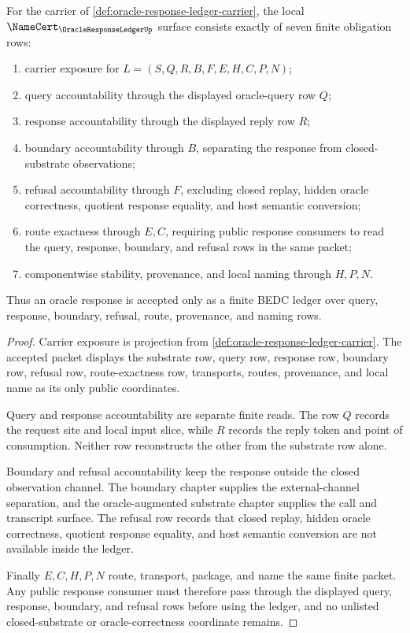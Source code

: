 \begin{theorem}
\label{thm:oracle-response-ledger-namecert-obligations}
For the carrier of \autoref{def:oracle-response-ledger-carrier}, the local
$\NameCert_{\OracleResponseLedgerUp}$ surface consists exactly of seven finite
obligation rows:
\begin{enumerate}
\item carrier exposure for $L=(S,Q,R,B,F,E,H,C,P,N)$;
\item query accountability through the displayed oracle-query row $Q$;
\item response accountability through the displayed reply row $R$;
\item boundary accountability through $B$, separating the response from
closed-substrate observations;
\item refusal accountability through $F$, excluding closed replay, hidden
oracle correctness, quotient response equality, and host semantic conversion;
\item route exactness through $E,C$, requiring public response consumers to
read the query, response, boundary, and refusal rows in the same packet;
\item componentwise stability, provenance, and local naming through $H,P,N$.
\end{enumerate}
Thus an oracle response is accepted only as a finite BEDC ledger over query,
response, boundary, refusal, route, provenance, and naming rows.
\end{theorem}
\begin{proof}
Carrier exposure is projection from
\autoref{def:oracle-response-ledger-carrier}. The accepted packet displays
the substrate row, query row, response row, boundary row, refusal row,
route-exactness row, transports, routes, provenance, and local name as its only
public coordinates.

Query and response accountability are separate finite reads. The row $Q$
records the request site and local input slice, while $R$ records the reply
token and point of consumption. Neither row reconstructs the other from the
substrate row alone.

Boundary and refusal accountability keep the response outside the closed
observation channel. The boundary chapter supplies the external-channel
separation, and the oracle-augmented substrate chapter supplies the call and
transcript surface. The refusal row records that closed replay, hidden oracle
correctness, quotient response equality, and host semantic conversion are not
available inside the ledger.

Finally $E,C,H,P,N$ route, transport, package, and name the same finite packet.
Any public response consumer must therefore pass through the displayed query,
response, boundary, and refusal rows before using the ledger, and no unlisted
closed-substrate or oracle-correctness coordinate remains.
\end{proof}

